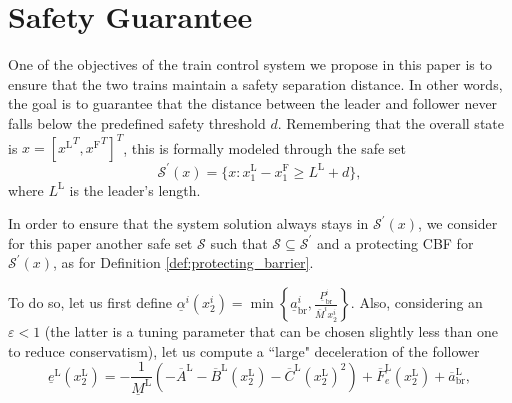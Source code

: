 \documentclass[letterpaper, 10 pt, conference]{ieeeconf}
\newcounter{Definition}
\theoremstyle{definition}
\newtheorem{definition}{Definition}
\theoremstyle{nopoint}
\begin{document}
  

  
  
 \section{Safety Guarantee}
 \label{sec:SafetyGuarantee}


\begin{comment}
	\begin{definition}[Braking Controller] \label{def:brakingController}
		Given the model present in \eqref{eq:dynamical_system_param_i} we define  $u^i(t)= K_\mathrm{B}(x^i(t))$ the braking controller as follows
		\begin{equation*}
			K_\mathrm{B}(x^i(t))=
			\begin{cases}
				\tilde{u}^i(x^i(t)) \leq 0 \qquad \mathit{if}\;  x_2^i(t) \geq 0\\
				0 \qquad\qquad\qquad \mathit{if}\;  x_2^i(t) = 0.
			\end{cases}     
		\end{equation*}
	\end{definition}
\end{comment}




One of the objectives of the train control system we propose in this paper is to ensure that the two trains maintain a safety separation distance. In other words, the goal is to guarantee that the distance between the leader and follower never falls below the predefined safety threshold $d$. Remembering that the overall state is $x=[{x^\mathrm{L}}^T,{x^\mathrm{F}}^T]^T$, this is formally modeled through the safe set
%
\begin{equation} \label{eq:distance}
\mathcal{S}^\prime(x)=\{x: x_1^\mathrm{L}- x_1^\mathrm{F} \geq  L^\mathrm{L} +d\},
\end{equation}
where $L^\mathrm{L}$ is the leader's length. 

In order to ensure that the system solution always stays in $\mathcal{S}^\prime(x)$, we consider for this paper another safe set $\mathcal{S}$ such that $\mathcal{S}\subseteq \mathcal{S}^\prime$ and a protecting CBF for $\mathcal{S}^\prime(x)$, as for Definition \ref{def:protecting_barrier}. 


To do so, let us first define $\underline{\alpha}^i \left( x_2^i\right)=\min \left\{\underline{a}^i_\mathrm{br},\frac{\underline{P}^i_\mathrm{br}}{\bar{M}^i x_2^i} \right\}$. Also, considering an $\varepsilon<1$ (the latter is a tuning parameter that can be chosen slightly less than one to reduce conservatism), let us compute a ``large" deceleration of the follower
\begin{equation*}
\underline{e}^\mathrm{L}\left(x_2^\mathrm{L}\right)=-\frac{1}{\underline{M}^\mathrm{L}}  \left(-\overline{A}^\mathrm{L}-\overline{B}^\mathrm{L} (x_2^\mathrm{L})- \overline{C}^\mathrm{L}\left(x_2^\mathrm{L}\right)^2\right)+ \overline{F}_e^\mathrm{L}(x_2^\mathrm{L})+\overline{a}^\mathrm{L}_\mathrm{br}, 
\end{equation*}
\end{document}
